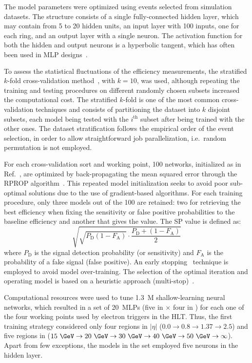 The model parameters were optimized using events selected from simulation datasets. 
The structure consists of a single fully-connected hidden layer, which may contain from 5 to 20 hidden units, an input layer with 100 inputs, one for each ring, and an output layer with a single neuron. 
The activation function for both the hidden and output neurons is a hyperbolic tangent, which has often been  used in MLP designs~\cite{haykin_2008}. 

To assess the statistical fluctuations of the efficiency measurements, the stratified $k$-fold cross-validation method~\cite{haykin_2008}, with $k=10$, was used, although repeating the training and testing procedures on different randomly chosen subsets increased the computational cost. 
The stratified $k$-fold is one of the most common cross-validation techniques and consists of partitioning the dataset into $k$ disjoint subsets, each model being tested with the $i^\text{th}$ subset after being trained with the other ones. The dataset stratification follows the empirical order of the event selection, in order to allow straightforward job parallelization, i.e.\ random permutation is not employed. 

For each cross-validation sort and working point, 100 networks, initialized as in Ref.~\cite{initnw}, are optimized by back-propagating the mean squared error through the RPROP algorithm~\cite{rprop}. This repeated model initialization seeks to avoid poor sub-optimal solutions due to the use of gradient-based algorithms.
For each training procedure, only three models out of the 100 are retained: two for retrieving the best efficiency when fixing the sensitivity or false positive probabilities to the baseline \fastcalo{} efficiency and another that gives the \spmax{} value. The SP value is defined as:
\begin{equation*}
\sqrt{\sqrt{P_\text{D}(1-F_\text{A})}\cdot\frac{P_\text{D} + (1-F_\text{A})}{2}}
\end{equation*}
\noindent where $P_\text{D}$ is the signal detection probability (or sensitivity) and $F_\text{A}$ is the probability of a fake signal (false positive). An early stopping~\cite{haykin_2008} technique is employed to avoid model over-training. The selection of the optimal iteration and operating model is based on a heuristic approach (multi-stop)~\cite{Goodfellow2016}.


Computational resources were used to tune 1.3~M shallow-learning neural networks, which resulted in a set of \SI{20}{MLPs} (five in \et{} $\times$ four in \abseta{}) for each one of the four working points used by electron triggers in the HLT. 
Thus, the first training strategy considered only four regions in $|\eta|$ ($0.0\rightarrow 0.8\rightarrow1.37\rightarrow2.5$) and five regions in \ET ($15~\GeV\rightarrow 20~\GeV\rightarrow 30~\GeV\rightarrow 40~\GeV\rightarrow 50~\GeV\rightarrow\infty$).
Apart from few exceptions, the models in the set employed five neurons in the hidden layer. 

